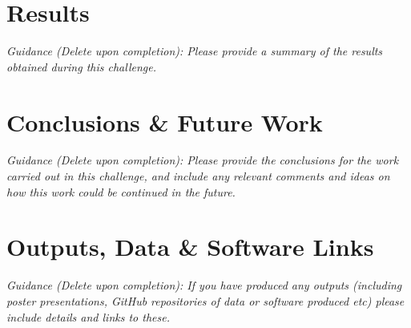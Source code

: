 \documentclass[11pt, titlepage]{article}
\begin{document}
\section{Results}
\label{section:results}
\textit{Guidance (Delete upon completion): Please provide a summary of the results obtained during this challenge.}

\section{Conclusions \& Future Work}
\label{section:conclusions}
\textit{Guidance (Delete upon completion): Please provide the conclusions for the work carried out in this challenge, and include any relevant comments and ideas on how this work could be continued in the future. }

\section{Outputs, Data \& Software Links}
\label{section:outputs}
\textit{Guidance (Delete upon completion): If you have produced any outputs (including poster presentations, GitHub repositories of data or software produced etc) please include details and links to these. }




\listoffigures
\end{document}
